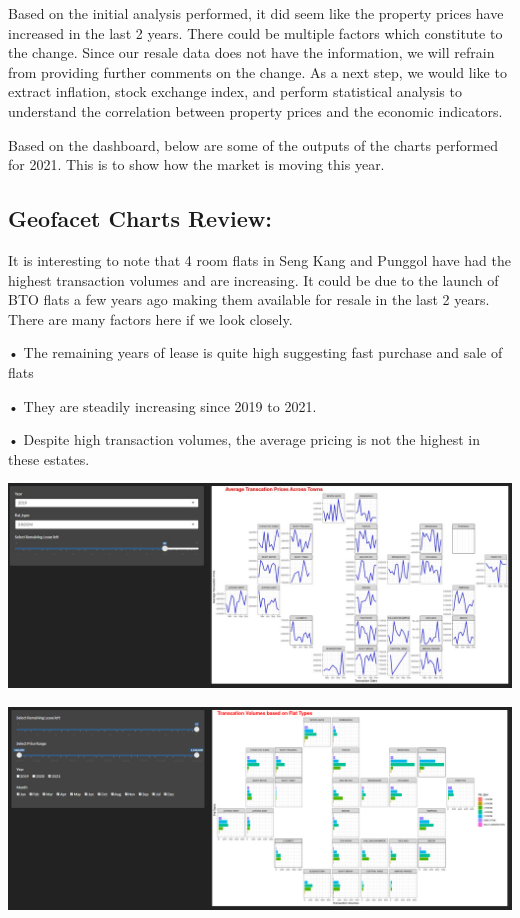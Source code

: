 \documentclass{acm_proc_article-sp}
\begin{document}
Based on the initial analysis performed, it did seem like the property
prices have increased in the last 2 years. There could be multiple
factors which constitute to the change. Since our resale data does not
have the information, we will refrain from providing further comments on
the change. As a next step, we would like to extract inflation, stock
exchange index, and perform statistical analysis to understand the
correlation between property prices and the economic indicators.

Based on the dashboard, below are some of the outputs of the charts
performed for 2021. This is to show how the market is moving this year.

\hypertarget{geofacet-charts-review}{%
\subsection{Geofacet Charts Review:}\label{geofacet-charts-review}}

It is interesting to note that 4 room flats in Seng Kang and Punggol
have had the highest transaction volumes and are increasing. It could be
due to the launch of BTO flats a few years ago making them available for
resale in the last 2 years. There are many factors here if we look
closely.

• The remaining years of lease is quite high suggesting fast purchase
and sale of flats

• They are steadily increasing since 2019 to 2021.

• Despite high transaction volumes, the average pricing is not the
highest in these estates.

\includegraphics{IMG/img11.jpg}

\includegraphics{IMG/img12.png}
\end{document}
